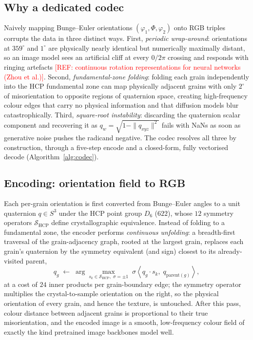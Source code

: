 \documentclass[preprint,12pt]{elsarticle}
\newcommand{\refneeded}[1]{\textcolor{red}{[REF: #1]}} %
\begin{document}
\subsection{Why a dedicated codec}
\label{sec:codec-why}

Naively mapping Bunge--Euler orientations $(\varphi_1, \Phi, \varphi_2)$ onto RGB triples corrupts the data in three distinct ways. First, \emph{periodic wrap-around}: orientations at $359^{\circ}$ and $1^{\circ}$ are physically nearly identical but numerically maximally distant, so an image model sees an artificial cliff at every $0/2\pi$ crossing and responds with ringing artefacts \refneeded{continuous rotation representations for neural networks (Zhou et al.)}. Second, \emph{fundamental-zone folding}: folding each grain independently into the HCP fundamental zone can map physically adjacent grains with only $2^{\circ}$ of misorientation to opposite regions of quaternion space, creating high-frequency colour edges that carry no physical information and that diffusion models blur catastrophically. Third, \emph{square-root instability}: discarding the quaternion scalar component and recovering it as $q_w = \sqrt{1 - \|q_{xyz}\|^2}$ fails with NaNs as soon as generative noise pushes the radicand negative. The codec resolves all three by construction, through a five-step encode and a closed-form, fully vectorised decode (Algorithm~\ref{alg:codec}).

\subsection{Encoding: orientation field to RGB}
\label{sec:codec-encode}

Each per-grain orientation is first converted from Bunge--Euler angles to a unit quaternion $q \in S^3$ under the HCP point group $D_6$ ($622$), whose $12$ symmetry operators $\mathcal{S}_{\mathrm{HCP}}$ define crystallographic equivalence. Instead of folding to a fundamental zone, the encoder performs \emph{continuous unfolding}: a breadth-first traversal of the grain-adjacency graph, rooted at the largest grain, replaces each grain's quaternion by the symmetry equivalent (and sign) closest to its already-visited parent,
\begin{equation}
q_{g} \;\leftarrow\; \arg\max_{s_k \in \mathcal{S}_{\mathrm{HCP}},\; \sigma = \pm 1} \; \sigma \left\langle q_{g} \cdot s_k,\; q_{\mathrm{parent}(g)} \right\rangle ,
\label{eq:bfs}
\end{equation}
at a cost of $24$ inner products per grain-boundary edge; the symmetry operator multiplies the crystal-to-sample orientation on the right, so the physical orientation of every grain, and hence the texture, is untouched. After this pass, colour distance between adjacent grains is proportional to their true misorientation, and the encoded image is a smooth, low-frequency colour field of exactly the kind pretrained image backbones model well.
\end{document}
